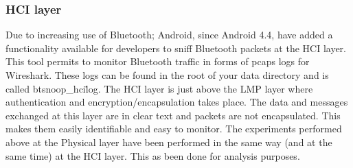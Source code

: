 \subsubsection{HCI layer}
Due to increasing use of Bluetooth; Android, since Android 4.4, have added a functionality available for developers to sniff Bluetooth packets at the HCI layer. This tool permits to monitor Bluetooth traffic in forms of pcaps logs for Wireshark. These logs can be found in the root of your data directory and is called btsnoop\_hci\.log.\pend
The HCI layer is just above the LMP layer where authentication and encryption/encapsulation takes place. The data and messages exchanged at this layer are in clear text and packets are not encapsulated. This makes them easily identifiable and easy to monitor. \pend
The experiments performed above at the Physical layer have been performed in the same way (and at the same time) at the HCI layer. This as been done for analysis purposes.
	
